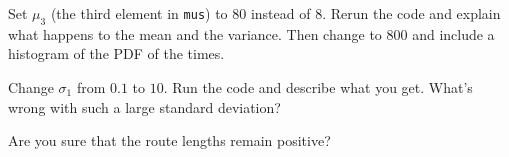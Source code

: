 \begin{exercise}
Set $\mu_3$ (the third element in \verb|mus|) to 80 instead of $8$. Rerun the code and explain what happens to the mean and the variance. Then change to 800 and include a histogram of the PDF of the times.
\end{exercise}


\begin{exercise}
Change $\sigma_1$ from $0.1$ to $10$.  Run the code and describe what you get. What's wrong with such a large standard deviation?
\begin{hint}
Are you sure that the route lengths remain positive?
\end{hint}
\end{exercise}
